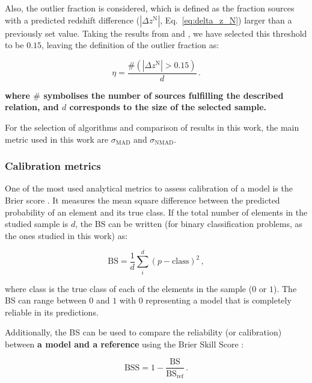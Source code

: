 \documentclass{aa}
\begin{document}
Also, the outlier fraction \citep[$\eta$, as used in][]{2013ApJ...775...93D, 2022A&C....3800510L} is considered, which is defined as the fraction sources with a predicted redshift difference ($\left|\Delta z^{\mathrm{N}}\right|$, Eq.~\ref{eq:delta_z_N}) larger than a previously set value. Taking the results from \citet{2009ApJ...690.1236I} and \citet{2010A&A...523A..31H}, we have selected this threshold to be $0.15$, leaving the definition of the outlier fraction as:

\begin{equation}\label{eq:outlier_fraction}
\eta = \frac{\# \left( \left|\Delta z^{\mathrm{N}}\right| > 0.15 \right)}{d}\,.
\end{equation}

\noindent\textbf{where $\#$ symbolises the number of sources fulfilling the described relation, and $d$ corresponds to the size of the selected sample.}

For the selection of algorithms and comparison of results in this work, the main metric used in this work are $\sigma_{\mathrm{MAD}}$ and $\sigma_{\mathrm{NMAD}}$.

\subsubsection{Calibration metrics}\label{sec:metrics_calibration}

One of the most used analytical metrics to assess calibration of a model is the Brier score \citep[BS;][]{Brier_1950}. It measures the mean square difference between the predicted probability of an element and its true class. If the total number of elements in the studied sample is $d$, the BS can be written (for binary classification problems, as the ones studied in this work) as:

\begin{equation}\label{eq:brier_score}
\mathrm{BS} = \frac{1}{d} \sum_{i}^{d}(p - \mathrm{class})^{2}\,,
\end{equation}

\noindent where  class is the true class of each of the elements in the sample ($0$ or $1$).
The BS can range between $0$ and $1$ with $0$ representing a model that is completely reliable in its predictions.

Additionally, the BS can be used to compare the reliability (or calibration) between \textbf{a model and a reference} using the Brier Skill Score \citep[BSS; e.g.][]{Glahn_1970}:

\begin{equation}\label{eq:brier_skill_score}
\mathrm{BSS} = 1 - \frac{\mathrm{BS}}{\mathrm{BS}_{\mathrm{ref}}}\,.
\end{equation}
\end{document}
